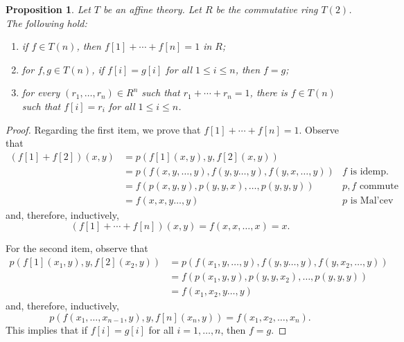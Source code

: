 \documentclass[10pt,a4paper]{amsart}
\newtheorem{proposition}{Proposition}
\begin{document}
\begin{proposition}
  \label{prop:coord}
  Let $T$ be an affine theory.
  Let $R$ be the commutative ring $T(2)$. 
  The following hold: 
  \begin{enumerate}
    \item if $f \in T(n)$, then $f[1]+\cdots+f[n]=1$ in $R$; 
    \item for $f,g \in T(n)$, if $f[i]=g[i]$ for all $1 \le i \le n$, then $f=g$; 
    \item for every $(r_1, \ldots, r_n) \in R^n$ such that $r_1+\cdots+r_n=1$, there is $f \in T(n)$ such that $f[i]=r_i$ for all $1 \le i \le n$. 
  \end{enumerate}
\end{proposition}

\begin{proof}
    Regarding the first item, we prove that $f[1] + \cdots + f[n] = 1$. 
    Observe that 
    \begin{align*}
      (f[1]+f[2])(x,y) & = p(f[1](x,y),y,f[2](x,y)) & \\
      & = p(f(x,y, \ldots, y) , f(y,y \ldots, y), f(y,x, \ldots, y)) & f \text{ is idemp.}\\
      & = f(p(x,y,y), p(y,y,x), \ldots, p(y,y,y)) & p,f \text{ commute} \\
      & = f(x,x,y \ldots, y) & p \text{ is Mal'cev} 
    \end{align*}
    and, therefore, inductively, 
    \begin{equation*}
      (f[1]+ \cdots + f[n])(x,y) = f(x,x, \ldots,x) =x \text{.}
    \end{equation*}

    For the second item, observe that 
    \begin{align*}
      p(f[1](x_1,y),y,f[2](x_2,y)) & = p(f(x_1,y, \ldots, y) , f(y,y \ldots, y), f(y,x_2, \ldots, y)) & \\
      & = f(p(x_1,y,y), p(y,y,x_2), \ldots, p(y,y,y)) &  \\
      & = f(x_1,x_2,y \ldots, y) &
    \end{align*}
    and, therefore, inductively, 
    \begin{equation*}
      p(f(x_1,\ldots,x_{n-1},y), y,f[n](x_n,y)) = f(x_1,x_2, \ldots,x_n)\text{.}
    \end{equation*}
    This implies that if $f[i]=g[i]$ for all $i=1, \ldots, n$, then $f = g$. 


\end{proof}
\end{document}
